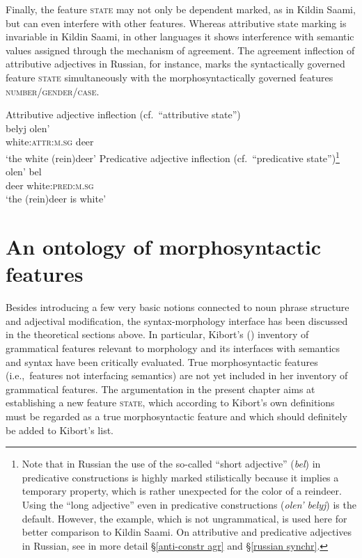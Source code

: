 Finally, the feature \textsc{state} may not only be dependent marked, as in Kildin Saami, but can even interfere with other features. Whereas attributive state marking is invariable in Kildin Saami, in other languages it shows interference with semantic values assigned through the mechanism of agreement. The agreement inflection of attributive adjectives in Russian, for instance, marks the syntactically governed feature \textsc{state} simultaneously with the morphosyntactically governed features \textsc{number/gender/case}.
\begin{exe}
\ex\label{state np russian}
\begin{xlist}
\ex 
\rm{Attributive adjective inflection (cf.~“attributive state”)}\\
\gll 	belyj	olen'\\
	white:\textsc{attr:m.sg}	deer\\
\glt 	‘the white (rein)deer’
\ex	
\rm{Predicative adjective inflection (cf.~“predicative state”)}\footnote{Note that in Russian the use of the so-called “short adjective” (\textit{bel}) in predicative constructions is highly marked stilistically because it implies a temporary property, which is rather unexpected for the color of a reindeer. Using the “long adjective” even in predicative constructions (\textit{olen' belyj}) is the default. However, the example, which is not ungrammatical, is used here for better comparison to Kildin Saami. On attributive and predicative adjectives in Russian, see in more detail \S\ref{anti-constr agr} and \S\ref{russian synchr}.}
\\
\gll	olen' bel\\
	deer white:\textsc{pred:m.sg}\\
\glt	‘the (rein)deer is white’
\end{xlist}
\end{exe}

\section{An ontology of morphosyntactic features}
Besides introducing a few very basic notions connected to noun phrase structure and adjectival modification, the syntax-morphology interface has been discussed in the theoretical sections above. In particular, Kibort's (\citeyear{kibort2010a}) inventory of grammatical features relevant to morphology and its interfaces with semantics and syntax have been critically evaluated. True morphosyntactic features (i.e.,~features not interfacing semantics) are not yet included in her inventory of grammatical features. The argumentation in the present chapter aims at establishing a new feature \textsc{state}, which according to Kibort's own definitions must be regarded as a true morphosyntactic feature and which should definitely be added to Kibort's list. 

